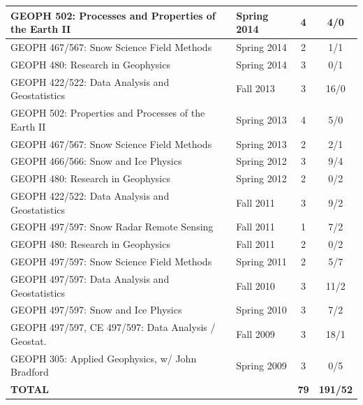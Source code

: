 \documentclass[11pt]{article}
\begin{document}
\begin{table}[!htbp]
\begin{tabular}{|l|l|c|c|}
GEOPH 502: Processes and Properties of the Earth II & Spring 2014 & 4 & 4/0 \\ \hline
GEOPH 467/567: Snow Science Field Methods & Spring 2014 & 2 & 1/1 \\ \hline
GEOPH 480: Research in Geophysics & Spring 2014 & 3 & 0/1 \\ \hline
GEOPH 422/522: Data Analysis and Geostatistics & Fall 2013 & 3 & 16/0 \\ \hline
GEOPH 502: Properties and Processes of the Earth II & Spring 2013 & 4 & 5/0 \\ \hline
GEOPH 467/567: Snow Science Field Methods & Spring 2013 & 2 & 2/1 \\ \hline
GEOPH 466/566: Snow and Ice Physics & Spring 2012 & 3 & 9/4 \\ \hline
GEOPH 480: Research in Geophysics & Spring 2012 & 2 & 0/2 \\ \hline
GEOPH 422/522: Data Analysis and Geostatistics & Fall 2011 & 3 & 9/2 \\ \hline
GEOPH 497/597: Snow Radar Remote Sensing & Fall 2011 & 1 & 7/2 \\ \hline
GEOPH 480: Research in Geophysics & Fall 2011 & 2 & 0/2 \\ \hline
GEOPH 497/597: Snow Science Field Methods & Spring 2011 & 2 & 5/7 \\ \hline
GEOPH 497/597: Data Analysis and Geostatistics & Fall 2010 & 3 & 11/2 \\ \hline
GEOPH 497/597: Snow and Ice Physics & Spring 2010 & 3 & 7/2 \\ \hline
GEOPH 497/597, CE 497/597: Data Analysis / Geostat. & Fall 2009 & 3 & 18/1  \\ \hline
GEOPH 305: Applied Geophysics, w/ John Bradford & Spring 2009 & 3 & 0/5 \\ \hline
\textbf{TOTAL} &  & \textbf{79} & \textbf{191/52} \\ \hline
\end{tabular}
\end{table}
\end{document}
